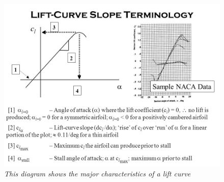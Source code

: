 \documentclass{journal}
\begin{document}
\begin{itemize}
		\begin{figure}
			\centering
			\includegraphics[scale=0.4]{../graphics/lift-curve-slope.jpg}
			\caption{\emph{This diagram shows the major characteristics of a lift curve}}
			\label{fig:lift-curve-slope}
		\end{figure}
	
	\end{itemize}
	
	
\end{document}
